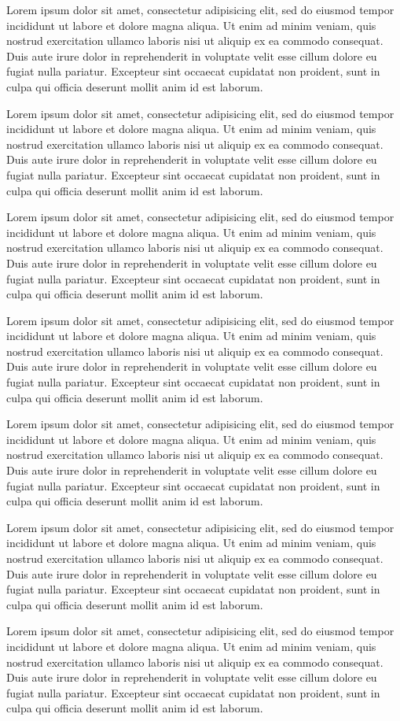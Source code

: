 Lorem ipsum dolor sit amet, consectetur adipisicing elit, sed do eiusmod tempor incididunt ut labore et dolore magna aliqua. Ut enim ad minim veniam, quis nostrud exercitation ullamco laboris nisi ut aliquip ex ea commodo consequat. Duis aute irure dolor in reprehenderit in voluptate velit esse cillum dolore eu fugiat nulla pariatur. Excepteur sint occaecat cupidatat non proident, sunt in culpa qui officia deserunt mollit anim id est laborum.

Lorem ipsum dolor sit amet, consectetur adipisicing elit, sed do eiusmod tempor incididunt ut labore et dolore magna aliqua. Ut enim ad minim veniam, quis nostrud exercitation ullamco laboris nisi ut aliquip ex ea commodo consequat. Duis aute irure dolor in reprehenderit in voluptate velit esse cillum dolore eu fugiat nulla pariatur. Excepteur sint occaecat cupidatat non proident, sunt in culpa qui officia deserunt mollit anim id est laborum.

Lorem ipsum dolor sit amet, consectetur adipisicing elit, sed do eiusmod tempor incididunt ut labore et dolore magna aliqua. Ut enim ad minim veniam, quis nostrud exercitation ullamco laboris nisi ut aliquip ex ea commodo consequat. Duis aute irure dolor in reprehenderit in voluptate velit esse cillum dolore eu fugiat nulla pariatur. Excepteur sint occaecat cupidatat non proident, sunt in culpa qui officia deserunt mollit anim id est laborum.

Lorem ipsum dolor sit amet, consectetur adipisicing elit, sed do eiusmod tempor incididunt ut labore et dolore magna aliqua. Ut enim ad minim veniam, quis nostrud exercitation ullamco laboris nisi ut aliquip ex ea commodo consequat. Duis aute irure dolor in reprehenderit in voluptate velit esse cillum dolore eu fugiat nulla pariatur. Excepteur sint occaecat cupidatat non proident, sunt in culpa qui officia deserunt mollit anim id est laborum.

Lorem ipsum dolor sit amet, consectetur adipisicing elit, sed do eiusmod tempor incididunt ut labore et dolore magna aliqua. Ut enim ad minim veniam, quis nostrud exercitation ullamco laboris nisi ut aliquip ex ea commodo consequat. Duis aute irure dolor in reprehenderit in voluptate velit esse cillum dolore eu fugiat nulla pariatur. Excepteur sint occaecat cupidatat non proident, sunt in culpa qui officia deserunt mollit anim id est laborum.

Lorem ipsum dolor sit amet, consectetur adipisicing elit, sed do eiusmod tempor incididunt ut labore et dolore magna aliqua. Ut enim ad minim veniam, quis nostrud exercitation ullamco laboris nisi ut aliquip ex ea commodo consequat. Duis aute irure dolor in reprehenderit in voluptate velit esse cillum dolore eu fugiat nulla pariatur. Excepteur sint occaecat cupidatat non proident, sunt in culpa qui officia deserunt mollit anim id est laborum.

Lorem ipsum dolor sit amet, consectetur adipisicing elit, sed do eiusmod tempor incididunt ut labore et dolore magna aliqua. Ut enim ad minim veniam, quis nostrud exercitation ullamco laboris nisi ut aliquip ex ea commodo consequat. Duis aute irure dolor in reprehenderit in voluptate velit esse cillum dolore eu fugiat nulla pariatur. Excepteur sint occaecat cupidatat non proident, sunt in culpa qui officia deserunt mollit anim id est laborum.